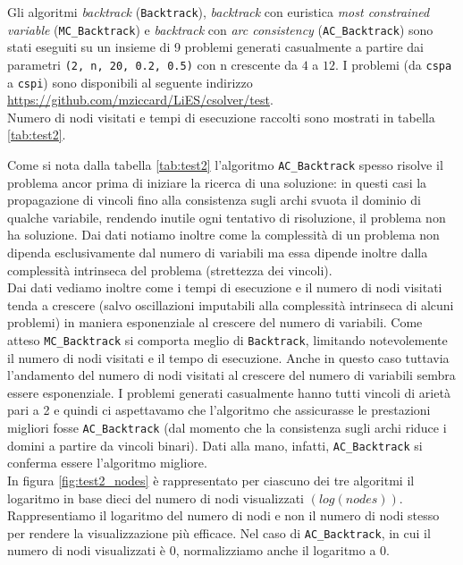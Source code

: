 \documentclass[10pt, a4paper]{article}
\begin{document}
Gli algoritmi \textit{backtrack} (\texttt{Backtrack}), \textit{backtrack} con euristica \textit{most constrained variable} (\texttt{MC\_Backtrack}) e \textit{backtrack} con \textit{arc consistency} (\texttt{AC\_Backtrack}) sono stati eseguiti su un insieme di 9 problemi generati casualmente a partire dai parametri \texttt{(2, n, 20, 0.2, 0.5)} con n crescente da $4$ a $12$. I problemi (da \texttt{cspa} a \texttt{cspi}) sono disponibili al seguente indirizzo \url{https://github.com/mziccard/LiES/csolver/test}.\\
Numero di nodi visitati e tempi di esecuzione raccolti sono mostrati in tabella \ref{tab:test2}.



Come si nota dalla tabella \ref{tab:test2} l'algoritmo \texttt{AC\_Backtrack} spesso risolve il problema ancor prima di iniziare la ricerca di una soluzione: in questi casi la propagazione di vincoli fino alla consistenza sugli archi svuota il dominio di qualche variabile, rendendo inutile ogni tentativo di risoluzione, il problema non ha soluzione. Dai dati notiamo inoltre come la complessità di un problema non dipenda esclusivamente dal numero di variabili ma essa dipende inoltre dalla complessità intrinseca del problema (strettezza dei vincoli).\\ Dai dati vediamo inoltre come i tempi di esecuzione e il numero di nodi visitati tenda a crescere (salvo oscillazioni imputabili alla complessità intrinseca di alcuni problemi) in maniera esponenziale al crescere del numero di variabili. Come atteso \texttt{MC\_Backtrack} si comporta meglio di \texttt{Backtrack}, limitando notevolemente il numero di nodi visitati e il tempo di esecuzione. Anche in questo caso tuttavia l'andamento del numero di nodi visitati al crescere del numero di variabili sembra essere esponenziale. I problemi generati casualmente hanno tutti vincoli di arietà pari a 2 e quindi ci aspettavamo che l'algoritmo che assicurasse le prestazioni migliori fosse \texttt{AC\_\allowbreak Backtrack} (dal momento che la consistenza sugli archi riduce i domini a partire da vincoli binari). Dati alla mano, infatti, \texttt{AC\_Backtrack} si conferma essere l'algoritmo migliore.\\
In figura \ref{fig:test2_nodes} è rappresentato per ciascuno dei tre algoritmi il logaritmo in base dieci del numero di nodi visualizzati $(log(nodes))$. Rappresentiamo il logaritmo del numero di nodi e non il numero di nodi stesso per rendere la visualizzazione più efficace. Nel caso di \texttt{AC\_Backtrack}, in cui il numero di nodi visualizzati è $0$, normalizziamo anche il logaritmo a $0$.
\end{document}
